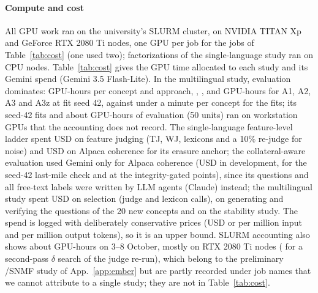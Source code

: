 \paragraph{Compute and cost}
All GPU work ran on the university's SLURM cluster, on NVIDIA TITAN Xp and GeForce RTX 2080 Ti nodes, one GPU per job for the jobs of Table~\ref{tab:cost} (one used two); factorizations of the single-language study ran on CPU nodes.
Table~\ref{tab:cost} gives the GPU time allocated to each study and its Gemini spend (Gemini 3.5 Flash-Lite).
In the multilingual study, evaluation dominates:  GPU-hours per concept and approach, , ,  and  GPU-hours for A1, A2, A3 and A3z at fit seed 42, against under a minute per concept for the fits; its seed-42 fits and about  GPU-hours of evaluation (50 units) ran on workstation GPUs that the accounting does not record.
The single-language feature-level ladder spent USD  on feature judging (TJ, WJ, lexicons and a 10\% re-judge for noise) and USD  on Alpaca coherence for its erasure anchor; the collateral-aware evaluation used Gemini only for Alpaca coherence (USD  in development,  for the seed-42 last-mile check and  at the integrity-gated points), since its questions and all free-text labels were written by LLM agents (Claude) instead; the multilingual study spent USD  on selection (judge and lexicon calls),  on generating and verifying the questions of the 20 new concepts and  on the stability study.
The spend is logged with deliberately conservative prices (USD  or  per million input and  per million output tokens), so it is an upper bound.
SLURM accounting also shows about  GPU-hours on 3--8 October, mostly on RTX 2080 Ti nodes ( for a second-pass $\delta$ search of the judge re-run), which belong to the preliminary \ember{}/SNMF study of App.~\ref{app:ember} but are partly recorded under job names that we cannot attribute to a single study; they are not in Table~\ref{tab:cost}.

